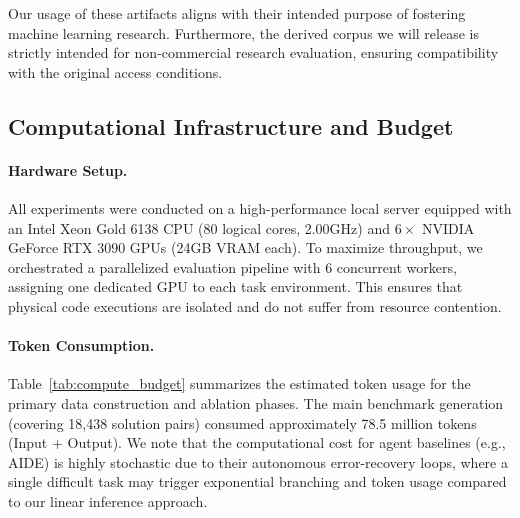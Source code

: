 Our usage of these artifacts aligns with their intended purpose of fostering machine learning research.
Furthermore, the derived corpus we will release is strictly intended for non-commercial research evaluation, ensuring compatibility with the original access conditions.


\subsection{Computational Infrastructure and Budget}
\label{app:compute}

\paragraph{Hardware Setup.}
All experiments were conducted on a high-performance local server equipped with an Intel Xeon Gold 6138 CPU (80 logical cores, 2.00GHz) and $6\times$ NVIDIA GeForce RTX 3090 GPUs (24GB VRAM each).
To maximize throughput, we orchestrated a parallelized evaluation pipeline with 6 concurrent workers, assigning one dedicated GPU to each task environment. This ensures that physical code executions are isolated and do not suffer from resource contention.

\paragraph{Token Consumption.}
Table~\ref{tab:compute_budget} summarizes the estimated token usage for the primary data construction and ablation phases.
The main benchmark generation (covering 18,438 solution pairs) consumed approximately 78.5 million tokens (Input + Output).
We note that the computational cost for agent baselines (e.g., AIDE) is highly stochastic due to their autonomous error-recovery loops, where a single difficult task may trigger exponential branching and token usage compared to our linear inference approach.

